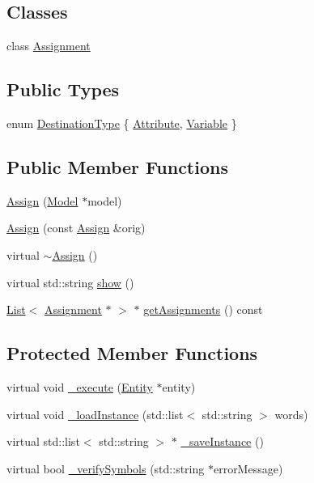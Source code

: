 \subsection*{Classes}
\begin{DoxyCompactItemize}
\item 
class \hyperlink{class_assign_1_1_assignment}{Assignment}
\end{DoxyCompactItemize}
\subsection*{Public Types}
\begin{DoxyCompactItemize}
\item 
enum \hyperlink{class_assign_ae0f42117c12a8d0bc2bf0b7574070694}{Destination\-Type} \{ \hyperlink{class_assign_ae0f42117c12a8d0bc2bf0b7574070694ada06eaebb0fa138e88ff06aa3ec421a0}{Attribute}, 
\hyperlink{class_assign_ae0f42117c12a8d0bc2bf0b7574070694a4977ebf07df3d5858a48313de98b4692}{Variable}
 \}
\end{DoxyCompactItemize}
\subsection*{Public Member Functions}
\begin{DoxyCompactItemize}
\item 
\hyperlink{class_assign_afaa746a0ce157d4606823ad508dc6281}{Assign} (\hyperlink{class_model}{Model} $\ast$model)
\item 
\hyperlink{class_assign_ae4945adcf1b5dcdd3f57faa9dd85a2b0}{Assign} (const \hyperlink{class_assign}{Assign} \&orig)
\item 
virtual \hyperlink{class_assign_aa005626af06022d9101c5e38e794dc47}{$\sim$\-Assign} ()
\item 
virtual std\-::string \hyperlink{class_assign_af5022b92204adcd9ee3e444b7e316d07}{show} ()
\item 
\hyperlink{class_list}{List}$<$ \hyperlink{class_assign_1_1_assignment}{Assignment} $\ast$ $>$ $\ast$ \hyperlink{class_assign_aca4aaa2185cc8770e56e1b6928c33dc0}{get\-Assignments} () const 
\end{DoxyCompactItemize}
\subsection*{Protected Member Functions}
\begin{DoxyCompactItemize}
\item 
virtual void \hyperlink{class_assign_a5fabf69268b2e65d8b01ce247be87a40}{\-\_\-execute} (\hyperlink{class_entity}{Entity} $\ast$entity)
\item 
virtual void \hyperlink{class_assign_a95e3169a6ae13ef3dc6dd9f0dde16c30}{\-\_\-load\-Instance} (std\-::list$<$ std\-::string $>$ words)
\item 
virtual std\-::list$<$ std\-::string $>$ $\ast$ \hyperlink{class_assign_a8b38a0a1bec283f5d2f44f67be5a4a6b}{\-\_\-save\-Instance} ()
\item 
virtual bool \hyperlink{class_assign_a5f3a7d8a7214574fea926cae1b1acb94}{\-\_\-verify\-Symbols} (std\-::string $\ast$error\-Message)
\end{DoxyCompactItemize}
